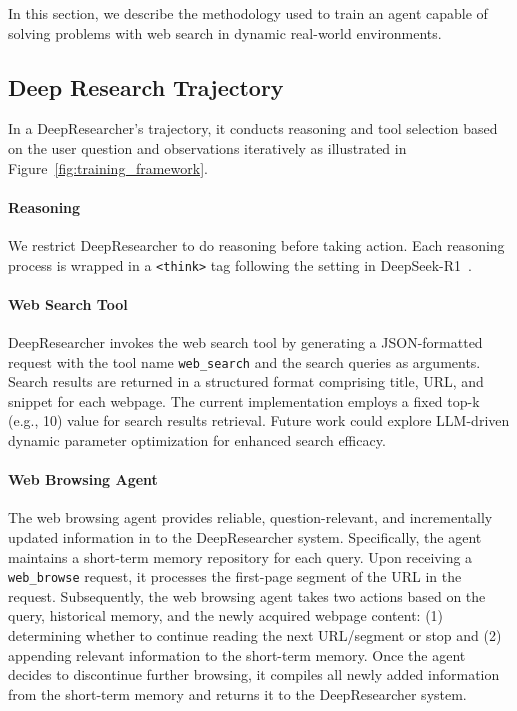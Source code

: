 \documentclass{article}
\newcommand{\scrl}{DeepResearcher\xspace}
\begin{document}
In this section, we describe the methodology used to train an agent capable of solving problems with web search in dynamic real-world environments.

\subsection{Deep Research Trajectory}

In a \scrl's trajectory, it conducts reasoning and tool selection based on the user question and observations iteratively as illustrated in Figure~\ref{fig:training_framework}.

\paragraph{Reasoning}
We restrict \scrl to do reasoning before taking action. Each reasoning process is wrapped in a \texttt{<think>} tag following the setting in DeepSeek-R1~\cite{guo2025deepseek}. 

\paragraph{Web Search Tool} \scrl invokes the web search tool by generating a JSON-formatted request with the tool name \texttt{web\_search} and the search queries as arguments. Search results are returned in a structured format comprising title, URL, and snippet for each webpage. The current implementation employs a fixed top-k (e.g., 10) value for search results retrieval. Future work could explore LLM-driven dynamic parameter optimization for enhanced search efficacy.

\paragraph{Web Browsing Agent}
The web browsing agent provides reliable, question-relevant, and incrementally updated information in to the \scrl system. Specifically, the agent maintains a short-term memory repository for each query. Upon receiving a \texttt{web\_browse} request, it processes the first-page segment of the URL in the request.
Subsequently, the web browsing agent takes two actions based on the query, historical memory, and the newly acquired webpage content: (1) determining whether to continue reading the next URL/segment or stop and (2) appending relevant information to the short-term memory. Once the agent decides to discontinue further browsing, it compiles all newly added information from the short-term memory and returns it to the \scrl system.
\end{document}

